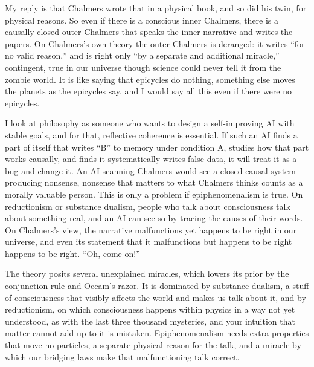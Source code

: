 My reply is that Chalmers wrote that in a physical book, and so did his twin, for physical reasons. So even if there is a conscious inner Chalmers, there is a causally closed outer Chalmers that speaks the inner narrative and writes the papers. On Chalmers's own theory the outer Chalmers is deranged: it writes ``for no valid reason,'' and is right only ``by a separate and additional miracle,'' contingent, true in our universe though science could never tell it from the zombie world.  It is like saying that epicycles do nothing, something else moves the planets as the epicycles say, and I would say all this even if there were no epicycles.

I look at philosophy as someone who wants to design a self-improving AI with stable goals, and for that, reflective coherence is essential. If such an AI finds a part of itself that writes ``B'' to memory under condition A, studies how that part works causally, and finds it systematically writes false data, it will treat it as a bug and change it. An AI scanning Chalmers would see a closed causal system producing nonsense, nonsense that matters to what Chalmers thinks counts as a morally valuable person.  This is only a problem if epiphenomenalism is true. On reductionism or substance dualism, people who talk about consciousness talk about something real, and an AI can see so by tracing the causes of their words. On Chalmers's view, the narrative malfunctions yet happens to be right in our universe, and even its statement that it malfunctions but happens to be right happens to be right. ``Oh, come on!''

The theory posits several unexplained miracles, which lowers its prior by the conjunction rule and Occam's razor. It is dominated by substance dualism, a stuff of consciousness that visibly affects the world and makes us talk about it, and by reductionism, on which consciousness happens within physics in a way not yet understood, as with the last three thousand mysteries, and your intuition that matter cannot add up to it is mistaken. Epiphenomenalism needs extra properties that move no particles, a separate physical reason for the talk, and a miracle by which our bridging laws make that malfunctioning talk correct. 

